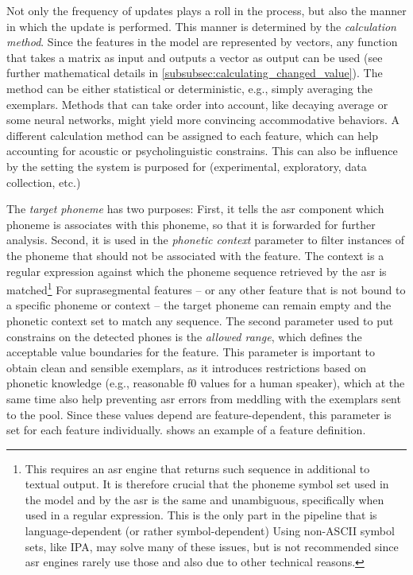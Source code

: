 Not only the frequency of updates plays a roll in the process, but also the manner in which the update is performed.
This manner is determined by the \textit{calculation method}.
Since the features in the model are represented by vectors, any function that takes a matrix as input and outputs a vector as output can be used (see further mathematical details in \cref{subsubsec:calculating_changed_value}).
The method can be either statistical or deterministic, e.g., simply averaging the exemplars.
Methods that can take order into account, like decaying average or some neural networks, might yield more convincing accommodative behaviors.
A different calculation method can be assigned to each feature, which can help accounting for acoustic or psycholinguistic constrains.
This can also be influence by the setting the system is purposed for (experimental, exploratory, data collection, etc.)

The \emph{target phoneme} has two purposes:
First, it tells the \ac{asr} component which phoneme is associates with this phoneme, so that it is forwarded for further analysis.
Second, it is used in the \emph{phonetic context} parameter to filter instances of the phoneme that should not be associated with the feature.
The context is a regular expression against which the phoneme sequence retrieved by the \ac{asr} is matched\footnote{This requires an \ac{asr} engine that returns such sequence in additional to textual output.
It is therefore crucial that the phoneme symbol set used in the model and by the \ac{asr} is the same and unambiguous, specifically when used in a regular expression.
This is the only part in the pipeline that is language-dependent (or rather symbol-dependent)
Using non-ASCII symbol sets, like IPA, may solve many of these issues, but is not recommended since \ac{asr} engines rarely use those and also due to other technical reasons.}
For suprasegmental features -- or any other feature that is not bound to a specific phoneme or context -- the target phoneme can remain empty and the phonetic context set to match any sequence.
The second parameter used to put constrains on the detected phones is the \emph{allowed range}, which defines the acceptable value boundaries for the feature.
This parameter is important to obtain clean and sensible exemplars, as it introduces restrictions based on phonetic knowledge (e.g., reasonable \ac{f0} values for a human speaker), which at the same time also help preventing \ac{asr} errors from meddling with the exemplars sent to the pool.
Since these values depend are feature-dependent, this parameter is set for each feature individually.
 shows an example of a feature definition.

